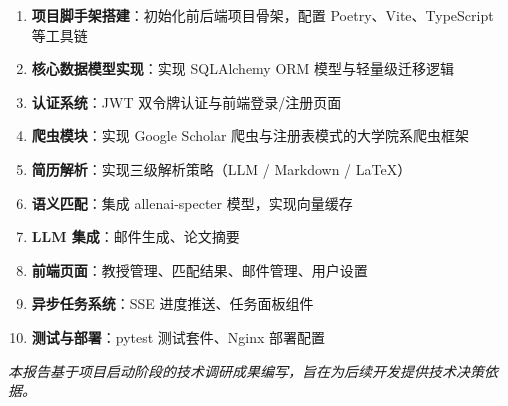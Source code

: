 \documentclass[11pt]{article}
\begin{document}
\begin{enumerate}
    \item \textbf{项目脚手架搭建}：初始化前后端项目骨架，配置 Poetry、Vite、TypeScript 等工具链
    \item \textbf{核心数据模型实现}：实现 SQLAlchemy ORM 模型与轻量级迁移逻辑
    \item \textbf{认证系统}：JWT 双令牌认证与前端登录/注册页面
    \item \textbf{爬虫模块}：实现 Google Scholar 爬虫与注册表模式的大学院系爬虫框架
    \item \textbf{简历解析}：实现三级解析策略（LLM / Markdown / LaTeX）
    \item \textbf{语义匹配}：集成 allenai-specter 模型，实现向量缓存
    \item \textbf{LLM 集成}：邮件生成、论文摘要
    \item \textbf{前端页面}：教授管理、匹配结果、邮件管理、用户设置
    \item \textbf{异步任务系统}：SSE 进度推送、任务面板组件
    \item \textbf{测试与部署}：pytest 测试套件、Nginx 部署配置
\end{enumerate}

\vspace{1em}
\begin{center}
\textit{本报告基于项目启动阶段的技术调研成果编写，旨在为后续开发提供技术决策依据。}
\end{center}
\end{document}
